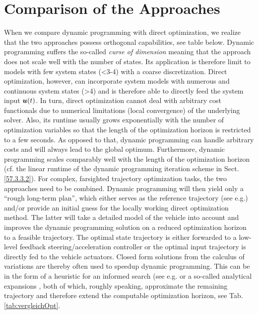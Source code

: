 \section{Comparison of the Approaches}\label{S:57.4}


When we compare dynamic programming with direct optimization, we realize that the two approaches possess orthogonal capabilities, see table below.
 Dynamic programming suffers the so-called \emph{curse of dimension} \cite{bellman_DP} 
meaning that the approach does not scale well with the number of states. Its application is therefore limit to models with few system states (<3-4) with a coarse discretization. Direct optimization, however, can incorporate system models with numerous and continuous system states (>4) and is therefore able to directly feed the system input $\boldsymbol{u}(t)$. In turn, direct optimization cannot deal with arbitrary cost functionals due to numerical limitations (local convergence) of the underlying solver. Also, its runtime usually grows exponentially with the number of optimization variables so that the length of the optimization horizon is restricted to a few seconds. As opposed to that, dynamic programming can handle arbitrary costs and will always lead to the global optimum. Furthermore, dynamic programming scales comparably well with the length of the optimization horizon (cf. the linear runtime of the dynamic programming iteration scheme in  Sect. \ref{57.3.3.2}). 
For complex, farsighted trajectory optimization tasks, the two approaches need to be combined. Dynamic programming will then yield only a “rough long-term plan”, which either serves as the reference trajectory (see e.g.\cite{Ferguson2008, Ferguson2008b, gu2013focused}) and/or provide an initial guess \cite{kang2012online} %
for the locally working direct optimization method. The latter will take a detailed model of the vehicle into account and improves the dynamic programming solution on a reduced optimization horizon to a feasible trajectory. The optimal state trajectory is either forwarded to a low-level feedback steering/acceleration controller or the optimal input trajectory is directly fed to the vehicle actuators.
Closed form solutions from the calculus of variations are thereby often used to speedup dynamic programming. This can be in the form of a heuristic for an informed search (see e.g. \cite{zieglerIV08} %
or a so-called analytical expansions \cite{dolgov2010path}, %
both of which, roughly speaking, approximate the remaining trajectory and therefore extend the computable optimization horizon, see  Tab.\,\ref{tab:vergleichOpt}.

